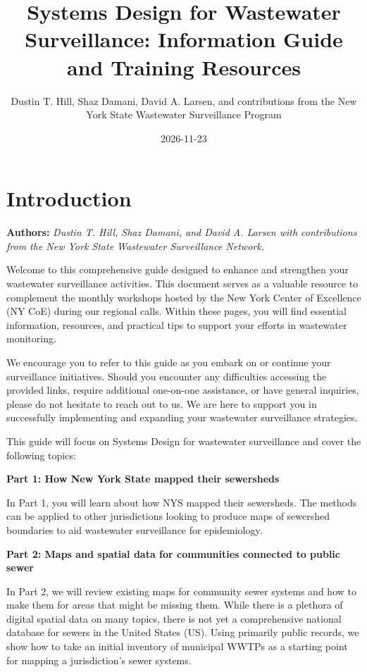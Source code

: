 \documentclass[
]{book}
\title{Systems Design for Wastewater Surveillance: Information Guide and Training Resources}
\author{Dustin T. Hill, Shaz Damani, David A. Larsen, and contributions from the New York State Wastewater Surveillance Program}
\date{2026-11-23}
\begin{document}
\maketitle

{
\setcounter{tocdepth}{1}
\tableofcontents
}
\chapter{Introduction}\label{introduction}

\textbf{Authors:} \emph{Dustin T. Hill, Shaz Damani, and David A. Larsen with contributions from the New York State Wastewater Surveillance Network.}

Welcome to this comprehensive guide designed to enhance and strengthen your wastewater surveillance activities. This document serves as a valuable resource to complement the monthly workshops hosted by the New York Center of Excellence (NY CoE) during our regional calls. Within these pages, you will find essential information, resources, and practical tips to support your efforts in wastewater monitoring.

We encourage you to refer to this guide as you embark on or continue your surveillance initiatives. Should you encounter any difficulties accessing the provided links, require additional one-on-one assistance, or have general inquiries, please do not hesitate to reach out to us. We are here to support you in successfully implementing and expanding your wastewater surveillance strategies.

This guide will focus on Systems Design for wastewater surveillance and cover the following topics:

\textbf{Part 1: How New York State mapped their sewersheds}

In Part 1, you will learn about how NYS mapped their sewersheds. The methods can be applied to other jurisdictions looking to produce maps of sewershed boundaries to aid wastewater surveillance for epidemiology.

\textbf{Part 2: Maps and spatial data for communities connected to public sewer}

In Part 2, we will review existing maps for community sewer systems and how to make them for areas that might be missing them. While there is a plethora of digital spatial data on many topics, there is not yet a comprehensive national database for sewers in the United States (US). Using primarily public records, we show how to take an initial inventory of municipal WWTPs as a starting point for mapping a jurisdiction's sewer systems.
\end{document}
